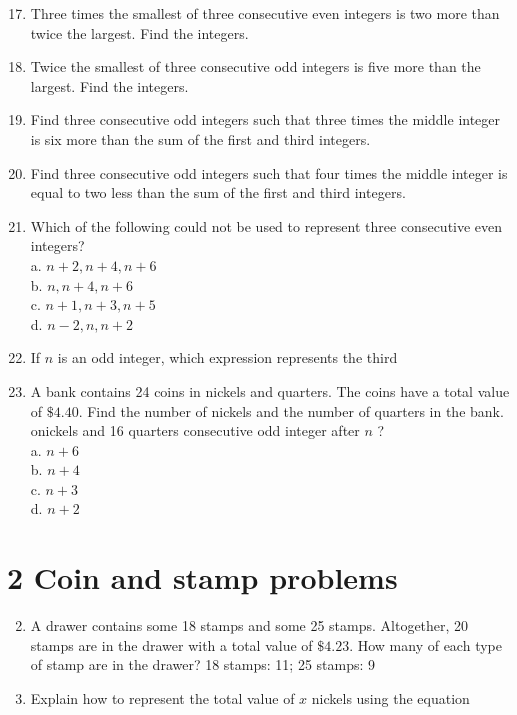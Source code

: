 \documentclass{ximera}
\begin{document}
\begin{enumerate}
  \setcounter{enumi}{16}
  \item Three times the smallest of three consecutive even integers is two more than twice the largest. Find the integers.
  \item Twice the smallest of three consecutive odd integers is five more than the largest. Find the integers.
  \item Find three consecutive odd integers such that three times the middle integer is six more than the sum of the first and third integers.
  \item Find three consecutive odd integers such that four times the middle integer is equal to two less than the sum of the first and third integers.
  \item Which of the following could not be used to represent three consecutive even integers?\\
a. $n+2, n+4, n+6$\\
b. $n, n+4, n+6$\\
c. $n+1, n+3, n+5$\\
d. $n-2, n, n+2$
  \item If $n$ is an odd integer, which expression represents the third
  \item A bank contains 24 coins in nickels and quarters. The coins have a total value of $\$ 4.40$. Find the number of nickels and the number of quarters in the bank. onickels and 16 quarters consecutive odd integer after $n$ ?\\
a. $n+6$\\
b. $n+4$\\
c. $n+3$\\
d. $n+2$
\end{enumerate}

\section*{2 Coin and stamp problems}
\begin{enumerate}
  \setcounter{enumi}{1}
  \item A drawer contains some 18\textcent{} stamps and some 25\textcent{} stamps. Altogether, 20 stamps are in the drawer with a total value of $\$ 4.23$. How many of each type of stamp are in the drawer? 18\textcent{} stamps: 11; 25\textcent{} stamps: 9
  \item Explain how to represent the total value of $x$ nickels using the equation
\end{enumerate}
\end{document}
